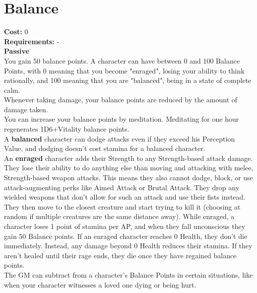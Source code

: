 \section{Balance}
\textbf{Cost:} 0\\
\textbf{Requirements:} -\\
\textbf{Passive}\\
You gain 50 balance points. A character can have between 0 and 100 Balance Points, with 0 meaning that you become "enraged", losing your ability to think rationally, and 100 meaning that you are "balanced", being in a state of complete calm.\\
Whenever taking damage, your balance points are reduced by the amount of damage taken.\\
You can increase your balance points by meditation. Meditating for one hour regenerates 1D6+Vitality balance points.\\
A \textbf{balanced} character can dodge attacks even if they exceed his Perception Value, and dodging doesn't cost stamina for a balanced character.\\
An \textbf{enraged} character adds their Strength to any Strength-based attack damage. They lose their ability to do anything else than moving and attacking with melee, Strength-based weapon attacks. This means they also cannot dodge, block, or use attack-augmenting perks like Aimed Attack or Brutal Attack. They drop any wielded weapons that don't allow for such an attack and use their fists instead. They then move to the closest creature and start trying to kill it (choosing at random if multiple creatures are the same distance away). While enraged, a character loses 1 point of stamina per AP, and when they fall unconscious they gain 50 Balance points. If an enraged character reaches 0 Health, they don't die immediately. Instead, any damage beyond 0 Health reduces their stamina. If they aren't healed until their rage ends, they die once they have regained balance points.\\
The GM can subtract from a character's Balance Points in certain situations, like when your character witnesses a loved one dying or being hurt.